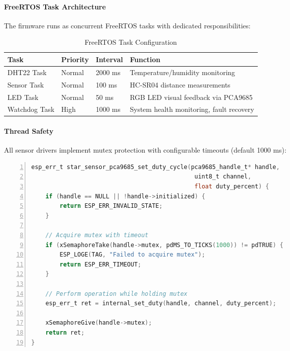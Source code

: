 \paragraph{FreeRTOS Task Architecture}

The firmware runs as concurrent FreeRTOS tasks with dedicated responsibilities:

\begin{table}[H]
\centering
\caption{FreeRTOS Task Configuration}
\begin{tabular}{@{}lllp{5cm}@{}}
\toprule
\textbf{Task} & \textbf{Priority} & \textbf{Interval} & \textbf{Function} \\
\midrule
DHT22 Task & Normal & 2000 ms & Temperature/humidity monitoring \\
Sensor Task & Normal & 100 ms & HC-SR04 distance measurements \\
LED Task & Normal & 50 ms & RGB LED visual feedback via PCA9685 \\
Watchdog Task & High & 1000 ms & System health monitoring, fault recovery \\
\bottomrule
\end{tabular}
\end{table}

\paragraph{Thread Safety}

All sensor drivers implement mutex protection with configurable timeouts (default 1000 ms):

\begin{lstlisting}[language=C, caption={Thread-Safe State Modification}, basicstyle=\tiny\ttfamily, frame=single, numbers=left, float=h]
esp_err_t star_sensor_pca9685_set_duty_cycle(pca9685_handle_t* handle,
                                              uint8_t channel,
                                              float duty_percent) {
    if (handle == NULL || !handle->initialized) {
        return ESP_ERR_INVALID_STATE;
    }

    // Acquire mutex with timeout
    if (xSemaphoreTake(handle->mutex, pdMS_TO_TICKS(1000)) != pdTRUE) {
        ESP_LOGE(TAG, "Failed to acquire mutex");
        return ESP_ERR_TIMEOUT;
    }

    // Perform operation while holding mutex
    esp_err_t ret = internal_set_duty(handle, channel, duty_percent);

    xSemaphoreGive(handle->mutex);
    return ret;
}
\end{lstlisting}

